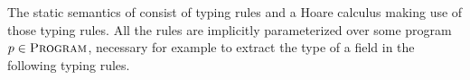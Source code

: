 The static semantics of \svl consist of typing rules and a Hoare calculus making use of those typing rules.
All the rules are implicitly parameterized over some program $p \in \textsc{Program}$, necessary for example to extract the type of a field in the following typing rules.
